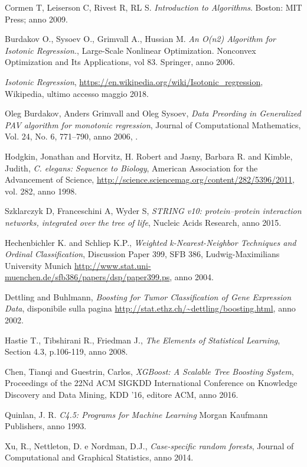\documentclass[12pt]{report}
\begin{document}
\begin{thebibliography}{00}
 Cormen T, Leiserson C, Rivest R, RL S. \emph{Introduction to Algorithms}.
Boston: MIT Press; anno 2009.

 Burdakov O., Sysoev O., Grimvall A., Hussian M.   \emph{An O(n2) Algorithm for Isotonic Regression.}, Large-Scale Nonlinear Optimization. Nonconvex Optimization and Its Applications, vol 83. Springer, anno 2006.

 \emph{Isotonic Regression}, \url{https://en.wikipedia.org/wiki/Isotonic_regression}, Wikipedia, ultimo accesso maggio 2018.

 Oleg Burdakov, Anders Grimvall and Oleg Sysoev, \emph{Data Preording in Generalized PAV algorithm for monotonic regression}, Journal of Computational Mathematics, Vol. 24, No. 6, 771–790, anno 2006, .

 Hodgkin, Jonathan and Horvitz, H. Robert and Jasny, Barbara R. and Kimble, Judith, \emph{C. elegans: Sequence to Biology}, American Association for the Advancement of Science, \url{http://science.sciencemag.org/content/282/5396/2011}, vol. 282, anno 1998.

Szklarczyk D, Franceschini A, Wyder S, \emph{STRING v10: protein–protein interaction networks, integrated over the tree of life}, Nucleic Acids Research, anno 2015.

 Hechenbichler K. and Schliep K.P., 
\emph{Weighted k-Nearest-Neighbor Techniques and Ordinal
Classification}, Discussion Paper 399, SFB 386, Ludwig-Maximilians University Munich \url{http://www.stat.uni-muenchen.de/sfb386/papers/dsp/paper399.ps}, anno 2004.


 Dettling and Buhlmann,
\emph{Boosting for Tumor Classification of Gene Expression Data}, disponibile sulla pagina \url{http://stat.ethz.ch/~dettling/boosting.html}, anno 2002.


 Hastie T., Tibshirani R., Friedman J., \emph{The Elements of Statistical Learning}, Section 4.3, p.106-119, anno 2008.

 Chen, Tianqi and Guestrin, Carlos, \emph{XGBoost: A Scalable Tree Boosting System}, Proceedings of the 22Nd ACM SIGKDD International Conference on Knowledge Discovery and Data Mining, KDD '16, editore ACM, anno 2016.

 Quinlan, J. R. \emph{C4.5: Programs for Machine Learning} Morgan Kaufmann Publishers, anno 1993.

 Xu, R., Nettleton, D. e Nordman, D.J., \emph{Case-specific random forests}, Journal of Computational and Graphical Statistics, anno 2014.


\end{thebibliography}
\end{document}
